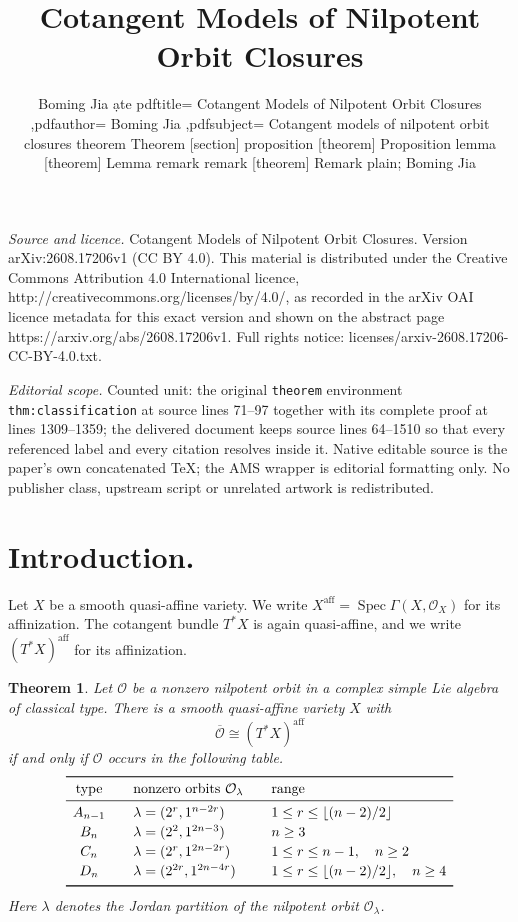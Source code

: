 \documentclass[10pt,a4paper]{amsart}
\newtheorem{theorem}{Theorem}[section]
\DeclareMathOperator{\Spec}{Spec}
\newcommand{\OO}{\mathcal O}
\newcommand{\aff}{\mathrm{aff}}
\begin{document}
\title[Cotangent Models of Nilpotent Orbit Closures]{Cotangent Models of Nilpotent Orbit Closures}
\author{Boming Jia ạte pdftitle= Cotangent Models of Nilpotent Orbit Closures ,pdfauthor= Boming Jia ,pdfsubject= Cotangent models of nilpotent orbit closures theorem Theorem [section] proposition [theorem] Proposition lemma [theorem] Lemma remark remark [theorem] Remark plain; Boming Jia}
\date{}
\maketitle
\noindent\emph{Source and licence.} Cotangent Models of Nilpotent Orbit Closures. Version arXiv:2608.17206v1 (CC BY 4.0). This material is distributed under the Creative Commons Attribution 4.0 International licence, http://creativecommons.org/licenses/by/4.0/, as recorded in the arXiv OAI licence metadata for this exact version and shown on the abstract page https://arxiv.org/abs/2608.17206v1. Full rights notice: licenses/arxiv-2608.17206-CC-BY-4.0.txt.\par\smallskip
\noindent\textit{Editorial scope.} Counted unit: the original \texttt{theorem} environment \texttt{thm:classification} at source lines 71--97 together with its complete proof at lines 1309--1359; the delivered document keeps source lines 64--1510 so that every referenced label and every citation resolves inside it. Native editable source is the paper's own concatenated TeX; the AMS wrapper is editorial formatting only. No publisher class, upstream script or unrelated artwork is redistributed.
\section{Introduction.}\label{sec:introduction}

Let $X$ be a smooth quasi-affine variety.
We write $X^{\aff}=\Spec\Gamma(X,\mathcal O_X)$ for its affinization.
The cotangent bundle $T^*X$ is again quasi-affine, and we write
$(T^*X)^{\aff}$ for its affinization.


\begin{theorem}\label{thm:classification}
Let $\mathcal O$ be a nonzero nilpotent orbit in a complex simple Lie
algebra of classical type.
There is a smooth quasi-affine variety $X$ with
\[
\overline{\mathcal O}\cong(T^*X)^{\aff}
\]
if and only if $\mathcal O$ occurs in the following table.
\[
\begin{array}{c@{\qquad}l@{\qquad}l}
\toprule
\text{type}&\text{nonzero orbits } \OO_\lambda&\text{range}\\
\midrule
A_{n-1}&\lambda=(2^r,1^{n-2r})
&1\leq r\leq\lfloor(n-2)/2\rfloor\\[2pt]
B_n&\lambda=(2^2,1^{2n-3})
&n\geq3\\[2pt]
C_n&\lambda=(2^r,1^{2n-2r})
&1\leq r\leq n-1,\quad n\geq2\\[2pt]
D_n&\lambda=(2^{2r},1^{2n-4r})
&1\leq r\leq\lfloor(n-2)/2\rfloor,\quad n\geq4\\[2pt]
\bottomrule
\end{array}
\]
Here $\lambda$ denotes the Jordan partition of the nilpotent orbit
$\OO_\lambda$.
\end{theorem}
\end{document}
